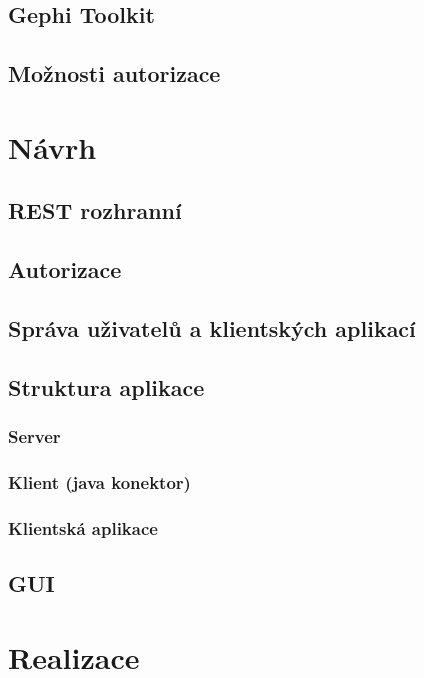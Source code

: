 \documentclass[thesis=B,czech]{FITthesis}[2012/06/26]
\begin{document}
\section{Gephi Toolkit}

\section{Možnosti autorizace}

\chapter{Návrh}

\section{REST rozhranní}

\section{Autorizace}

\section{Správa uživatelů a klientských aplikací}

\section{Struktura aplikace}
\subsection{Server}
\subsection{Klient (java konektor)}
\subsection{Klientská aplikace}

\section{GUI}

\chapter{Realizace}
\end{document}
